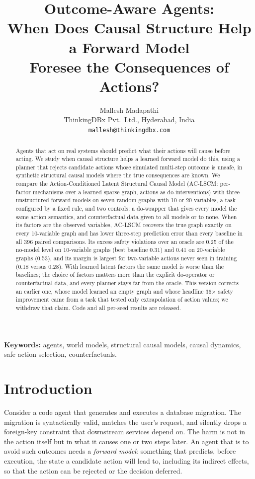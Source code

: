 \documentclass[11pt]{article}
\title{Outcome-Aware Agents:\\ When Does Causal Structure Help a Forward Model\\
Foresee the Consequences of Actions?}
\author{Mallesh Madapathi\\[2pt]
  \small ThinkingDBx Pvt.\ Ltd., Hyderabad, India\\
  \small \texttt{mallesh@thinkingdbx.com}}
\date{}
\begin{document}
\maketitle

\begin{abstract}
Agents that act on real systems should predict what their actions will cause
before acting. We study when causal structure helps a learned forward model do
this, using a planner that rejects candidate actions whose simulated
multi-step outcome is unsafe, in synthetic structural causal models where the
true consequences are known. We compare the Action-Conditioned Latent
Structural Causal Model (AC-LSCM: per-factor mechanisms over a learned sparse
graph, actions as do-interventions) with three unstructured forward models on
seven random graphs with 10 or 20 variables, a task configured by a fixed
rule, and two controls: a do-wrapper that gives every model the same action
semantics, and counterfactual data given to all models or to none. When its
factors are the observed variables, AC-LSCM recovers the true graph exactly
on every 10-variable graph and has lower three-step prediction error than
every baseline in all 396 paired comparisons. Its excess safety violations
over an oracle are 0.25 of the no-model level on 10-variable graphs (best
baseline 0.31) and 0.41 on 20-variable graphs (0.53), and its margin is
largest for two-variable actions never seen in training (0.18 versus 0.28).
With learned latent factors the same model is worse than the baselines; the
choice of factors matters more than the explicit do-operator or
counterfactual data, and every planner stays far from the oracle. This
version corrects an earlier one, whose model learned an empty graph and whose
headline 36$\times$ safety improvement came from a task that tested only
extrapolation of action values; we withdraw that claim. Code and all
per-seed results are released.
\end{abstract}

\noindent\textbf{Keywords:} agents, world models, structural causal models,
causal dynamics, safe action selection, counterfactuals.


\section{Introduction}

Consider a code agent that generates and executes a database migration. The
migration is syntactically valid, matches the user's request, and silently
drops a foreign-key constraint that downstream services depend on. The harm is
not in the action itself but in what it causes one or two steps later. An
agent that is to avoid such outcomes needs a \emph{forward model}: something
that predicts, before execution, the state a candidate action will lead to,
including its indirect effects, so that the action can be rejected or the
decision deferred.
\end{document}
